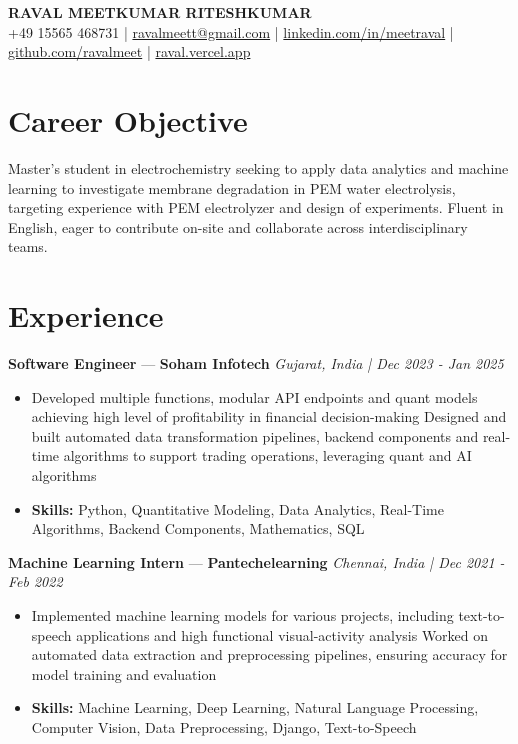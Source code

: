 \documentclass[a4paper,10pt]{article}
\begin{document}
\begin{center}
  {\Large\bfseries RAVAL MEETKUMAR RITESHKUMAR}\\[2pt]
  {\small +49 15565 468731 \;|\; \href{mailto:ravalmeett@gmail.com}{ravalmeett@gmail.com} \;|\; \href{https://www.linkedin.com/in/meetraval/}{linkedin.com/in/meetraval} \;|\; \href{https://github.com/ravalmeet}{github.com/ravalmeet} \;|\; \href{https://raval.vercel.app/}{raval.vercel.app}}
\end{center}
\vspace{-3pt}

\section*{Career Objective}
Master's student in electrochemistry seeking to apply data analytics and machine learning to investigate membrane degradation in PEM water electrolysis, targeting experience with PEM electrolyzer and design of experiments. Fluent in English, eager to contribute on-site and collaborate across interdisciplinary teams.\par

\section*{Experience}
\textbf{Software Engineer} — \textbf{Soham Infotech} \hfill \textit{Gujarat, India \;|\; Dec 2023 - Jan 2025}\par
\vspace{1pt}
\begin{itemize}
  \item Developed multiple functions, modular API endpoints and quant models achieving high level of profitability in financial decision-making Designed and built automated data transformation pipelines, backend components and real-time algorithms to support trading operations, leveraging quant and AI algorithms
  \item \textbf{Skills:} Python, Quantitative Modeling, Data Analytics, Real-Time Algorithms, Backend Components, Mathematics, SQL
\end{itemize}
\vspace{3pt}
\textbf{Machine Learning Intern} — \textbf{Pantechelearning} \hfill \textit{Chennai, India \;|\; Dec 2021 - Feb 2022}\par
\vspace{1pt}
\begin{itemize}
  \item Implemented machine learning models for various projects, including text-to-speech applications and high functional visual-activity analysis Worked on automated data extraction and preprocessing pipelines, ensuring accuracy for model training and evaluation
  \item \textbf{Skills:} Machine Learning, Deep Learning, Natural Language Processing, Computer Vision, Data Preprocessing, Django, Text-to-Speech
\end{itemize}
\end{document}
